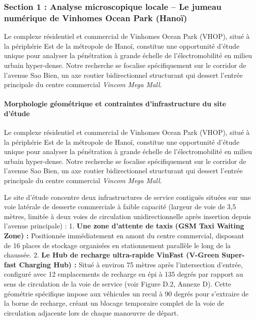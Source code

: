 \documentclass[10pt, a4paper]{article}
\begin{document}
\subsubsection{Section 1 : Analyse microscopique locale -- Le jumeau
numérique de Vinhomes Ocean Park
(Hanoï)}\label{section-1-analyse-microscopique-locale-le-jumeau-numuxe9rique-de-vinhomes-ocean-park-hanouxef}

Le complexe résidentiel et commercial de Vinhomes Ocean Park (VHOP),
situé à la périphérie Est de la métropole de Hanoï, constitue une
opportunité d'étude unique pour analyser la pénétration à grande échelle
de l'électromobilité en milieu urbain hyper-dense. Notre recherche se
focalise spécifiquement sur le corridor de l'avenue Sao Bien, un axe
routier bidirectionnel structurant qui dessert l'entrée principale du
centre commercial \emph{Vincom Mega Mall}.

\paragraph{Morphologie géométrique et contraintes d'infrastructure du
site
d'étude}\label{morphologie-guxe9omuxe9trique-et-contraintes-dinfrastructure-du-site-duxe9tude}

Le complexe résidentiel et commercial de Vinhomes Ocean Park (VHOP),
situé à la périphérie Est de la métropole de Hanoï, constitue une
opportunité d'étude unique pour analyser la pénétration à grande échelle
de l'électromobilité en milieu urbain hyper-dense. Notre recherche se
focalise spécifiquement sur le corridor de l'avenue Sao Bien, un axe
routier bidirectionnel structurant qui dessert l'entrée principale du
centre commercial \emph{Vincom Mega Mall}.

Le site d'étude concentre deux infrastructures de service contiguës
situées sur une voie latérale de desserte commerciale à faible capacité
(largeur de voie de 3,5 mètres, limitée à deux voies de circulation
unidirectionnelle après insertion depuis l'avenue principale) : 1.
\textbf{Une zone d'attente de taxis (GSM Taxi Waiting Zone) :}
Positionnée immédiatement en amont du centre commercial, disposant de 16
places de stockage organisées en stationnement parallèle le long de la
chaussée. 2. \textbf{Le Hub de recharge ultra-rapide VinFast (V-Green
Super-fast Charging Hub) :} Situé à environ 75 mètres après
l'intersection d'entrée, configuré avec 12 emplacements de recharge en
épi à 135 degrés par rapport au sens de circulation de la voie de
service (voir Figure D.2, Annexe D). Cette géométrie spécifique impose
aux véhicules un recul à 90 degrés pour s'extraire de la borne de
recharge, créant un blocage temporaire complet de la voie de circulation
adjacente lors de chaque manœuvre de départ.
\end{document}
